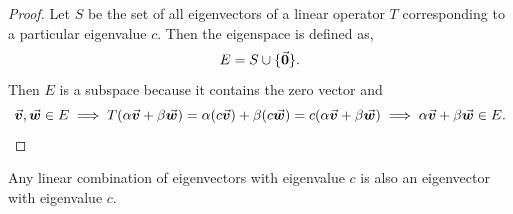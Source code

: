 \documentclass[MathsNotesBase.tex]{subfiles}
\begin{document}
{	 	\bigskip
	 	\begin{proof}
	 		Let $S$ be the set of all eigenvectors of a linear operator $T$ corresponding to a particular eigenvalue $c$. Then the eigenspace is defined as,
	 		\[ E = S \cup \{\vec{\bm{0}}\}. \]
	 		Then $E$ is a subspace because it contains the zero vector and
	 		\[ \vec{\bm{v}},\vec{\bm{w}} \in E \implies T(\alpha\vec{\bm{v}} + \beta\vec{\bm{w}}) = \alpha(c\vec{\bm{v}}) + \beta(c\vec{\bm{w}}) = c(\alpha\vec{\bm{v}} + \beta\vec{\bm{w}}) \implies \alpha\vec{\bm{v}} + \beta\vec{\bm{w}} \in E. \qedhere \]
	 	\end{proof}
 		\begin{corollary}
 			Any linear combination of eigenvectors with eigenvalue $c$ is also an eigenvector with eigenvalue $c$.
 		\end{corollary}
	 
	 	\bigskip\medskip
}
\end{document}
